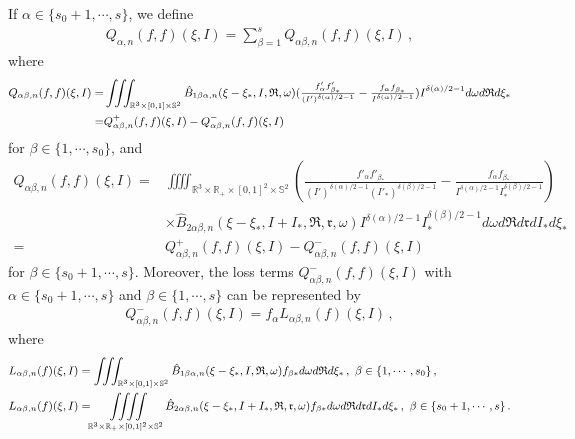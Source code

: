 \documentclass[reqno,11pt]{amsart}
\numberwithin{equation}{section}
\def\R{\mathbb{R}}
\begin{document}
If $\alpha \in \{ s_0 + 1, \cdots, s \}$, we define
\begin{equation*}
  \begin{aligned}
    Q_{\alpha, n} (f,f) (\xi, I) = \sum_{\beta = 1}^{s} Q_{\alpha \beta, n} (f, f) (\xi, I) \,,
  \end{aligned}
\end{equation*}
where
\begin{equation*}{\small
  \begin{aligned}
    Q_{\alpha \beta, n} (f, f) (\xi, I) = & \iiint_{\R^3 \times [0,1] \times \mathbb{S}^2} \hat{B}_{1\beta \alpha ,n} (\xi - \xi_*, I, \mathfrak{R}, \omega) (\tfrac{f'_\alpha f'_{\beta_*}}{(I')^{\delta(\alpha)/2-1} } - \tfrac{f_\alpha f_{\beta_*}}{I^{\delta(\alpha)/2-1}})  I^{\delta(\alpha )/2-1} d\omega d\mathfrak{R} d\xi_* \\
    = & Q_{\alpha \beta, n}^+ (f, f) (\xi, I) - Q_{\alpha \beta, n}^- (f, f) (\xi, I)
  \end{aligned}}
\end{equation*}
for $ \beta \in \{ 1, \cdots, s_0 \} $, and
\begin{equation*}
  \begin{aligned}
    Q_{\alpha \beta, n} (f, f) (\xi, I) = & \iiiint_{\R^3 \times \R_+ \times [0,1]^2 \times \mathbb{S}^2 } (\tfrac{f'_\alpha f'_{\beta_*}}{(I')^{\delta(\alpha)/2-1} (I'_* )^{\delta(\beta)/2-1}} - \tfrac{f_\alpha f_{\beta_*}}{I^{\delta(\alpha)/2-1} I_* ^{\delta(\beta)/2-1}})\\
		& \times \hat{B}_{2 \alpha \beta ,n} (\xi - \xi_*, I + I_*, \mathfrak{R}, \mathfrak{r}, \omega) I^{\delta(\alpha)/2-1 } I_*^{\delta (\beta )/2-1} d \omega d \mathfrak{R} d \mathfrak{r} d I_* d \xi_* \\
= & Q_{\alpha \beta, n}^+ (f, f) (\xi, I) - Q_{\alpha \beta, n}^- (f, f) (\xi, I)
  \end{aligned}
\end{equation*}
for $ \beta \in \{ s_0 + 1, \cdots, s \} $. Moreover, the loss terms $Q_{\alpha \beta, n}^- (f,f) (\xi, I)$ with $\alpha \in \{s_0 + 1, \cdots, s \}$ and $\beta \in \{ 1 , \cdots , s \}$ can be represented by
\begin{equation*}
  \begin{aligned}
    Q_{\alpha \beta, n}^- (f,f) (\xi, I) = f_\alpha L_{\alpha \beta, n} (f) (\xi, I) \,,
  \end{aligned}
\end{equation*}
where
\begin{equation*}{\small
  \begin{aligned}
    & L_{\alpha \beta, n} (f) (\xi, I) = \iiint_{\R^3 \times [0,1] \times \mathbb{S}^2} \hat{B}_{1\beta \alpha ,n} (\xi - \xi_*, I, \mathfrak{R}, \omega) f_{\beta *} d \omega d\mathfrak{R} d\xi_* \,, \ \beta \in \{ 1, \cdots, s_0 \} \,, \\
    & L_{\alpha \beta, n} (f) (\xi, I) = \iiiint\limits_{\R^3 \times \R_+ \times [0,1]^2 \times \mathbb{S}^2 } \hat{B}_{2 \alpha \beta ,n} (\xi - \xi_*, I + I_*, \mathfrak{R}, \mathfrak{r}, \omega) f_{\beta *} d \omega d \mathfrak{R} d \mathfrak{r} d I_* d \xi_* \,, \ \beta \in \{ s_0 + 1, \cdots, s \} \,.
  \end{aligned}}
\end{equation*}
\end{document}
